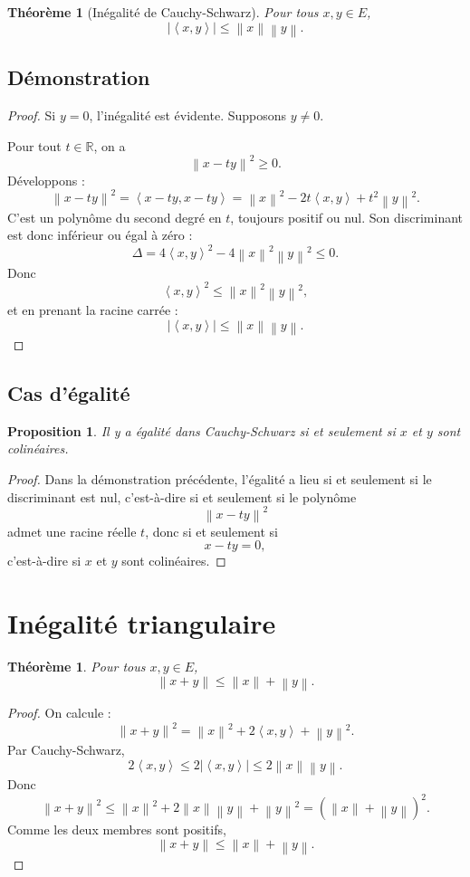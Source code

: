 \documentclass[11pt,a4paper]{article}
\newtheorem{theoreme}[definition]{Théorème}
\newtheorem{proposition}[definition]{Proposition}
\theoremstyle{remark}
\newcommand{\R}{\mathbb{R}}
\newcommand{\Norm}[1]{\left\|#1\right\|}
\newcommand{\abs}[1]{\left|#1\right|}
\newcommand{\scal}[2]{\left\langle #1,#2\right\rangle}
\begin{document}
\begin{theoreme}[Inégalité de Cauchy-Schwarz]
Pour tous \(x,y\in E\),
\[
\abs{\scal{x}{y}}\le \Norm{x}\Norm{y}.
\]
\end{theoreme}

\subsection{Démonstration}

\begin{proof}
Si \(y=0\), l’inégalité est évidente. Supposons \(y\neq 0\).

Pour tout \(t\in\R\), on a
\[
\Norm{x-ty}^2\ge 0.
\]
Développons :
\[
\Norm{x-ty}^2=\scal{x-ty}{x-ty}
=\Norm{x}^2-2t\scal{x}{y}+t^2\Norm{y}^2.
\]
C’est un polynôme du second degré en \(t\), toujours positif ou nul. Son discriminant est donc inférieur ou égal à zéro :
\[
\Delta=4\scal{x}{y}^2-4\Norm{x}^2\Norm{y}^2\le 0.
\]
Donc
\[
\scal{x}{y}^2\le \Norm{x}^2\Norm{y}^2,
\]
et en prenant la racine carrée :
\[
\abs{\scal{x}{y}}\le \Norm{x}\Norm{y}.
\]
\end{proof}

\subsection{Cas d’égalité}

\begin{proposition}
Il y a égalité dans Cauchy-Schwarz si et seulement si \(x\) et \(y\) sont colinéaires.
\end{proposition}

\begin{proof}
Dans la démonstration précédente, l’égalité a lieu si et seulement si le discriminant est nul, c’est-à-dire si et seulement si le polynôme
\[
\Norm{x-ty}^2
\]
admet une racine réelle \(t\), donc si et seulement si
\[
x-ty=0,
\]
c’est-à-dire si \(x\) et \(y\) sont colinéaires.
\end{proof}

\section{Inégalité triangulaire}

\begin{theoreme}
Pour tous \(x,y\in E\),
\[
\Norm{x+y}\le \Norm{x}+\Norm{y}.
\]
\end{theoreme}

\begin{proof}
On calcule :
\[
\Norm{x+y}^2=\Norm{x}^2+2\scal{x}{y}+\Norm{y}^2.
\]
Par Cauchy-Schwarz,
\[
2\scal{x}{y}\le 2\abs{\scal{x}{y}}\le 2\Norm{x}\Norm{y}.
\]
Donc
\[
\Norm{x+y}^2\le \Norm{x}^2+2\Norm{x}\Norm{y}+\Norm{y}^2=(\Norm{x}+\Norm{y})^2.
\]
Comme les deux membres sont positifs,
\[
\Norm{x+y}\le \Norm{x}+\Norm{y}.
\]
\end{proof}
\end{document}
